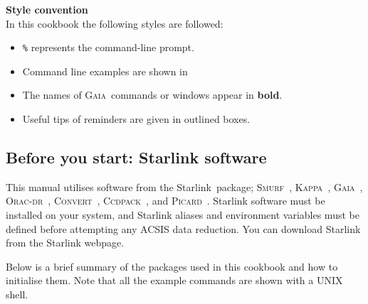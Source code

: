\documentclass[twoside,11pt]{article}
\newcommand{\htmladdnormallink}[2]{#1}
\newcommand{\xref}[3]{#1}
\newcommand{\xlabel}[1]{}
\renewcommand{\_}{\texttt{\symbol{95}}}
\newcommand{\starlink}{\htmladdnormallink{Starlink}{http://starlink.jach.hawaii.edu}}
\newcommand{\ccdpack}{\xref{\textsc{Ccdpack}}{sun139}{}}
\newcommand{\convert}{\xref{\textsc{Convert}}{sun55}{}}
\newcommand{\gaia}{\xref{\textsc{Gaia}}{sun214}{}}
\newcommand{\Kappa}{\xref{\textsc{Kappa}}{sun95}{}}
\newcommand{\oracdr}{\htmladdnormallink{\textsc{Orac-dr}}{http://www.oracdr.org/oracdr}}
\newcommand{\picard}{\xref{\textsc{Picard}}{sun265}{}}
\newcommand{\smurf}{\xref{\textsc{Smurf}}{sun258}{}}
\begin{document}
\textbf{Style convention}\\
In this cookbook the following styles are followed:
\begin{itemize}[noitemsep,nolistsep]
\item \texttt{\%}  represents the command-line prompt.
\item Command line examples are shown in \texttt{\color{MidnightBlue}{navy typewriter font.}}
\item The names of \gaia\ commands or windows appear in \textbf{bold}. 
\item Useful tips of reminders are given in outlined boxes.
\end{itemize}

\subsection{\xlabel{software}Before you start: Starlink software}

This manual utilises software from the \starlink\ package;
\smurf\ \cite{smurf}, \Kappa\ \cite{kappa}, \gaia\ \cite{gaia}, \oracdr\ \cite{oracdr}, \convert\ \cite{convert}, \ccdpack\ \cite{ccdpack}, and
\picard\ \cite{picard}. Starlink software must be installed on your system, and Starlink aliases
and environment variables must be defined before attempting any ACSIS data reduction. You can download Starlink from \xref{the Starlink webpage}{\starlink}{}.

Below is a brief summary of the packages used in this cookbook and how to initialise them. Note that all the example commands are shown with a UNIX shell. 
\end{document}
